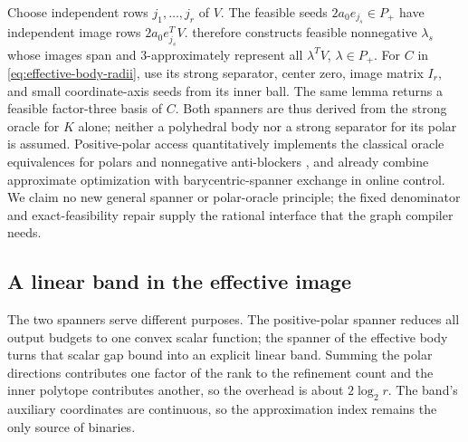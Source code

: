 Choose independent rows $j_1,\ldots,j_r$ of $V$.
The feasible seeds $2a_0e_{j_s}\in P_+$ have independent image rows
$2a_0e_{j_s}^TV$.  therefore constructs
feasible nonnegative $\lambda_s$ whose images span and
$3$-approximately represent all $\lambda^TV$, $\lambda\in P_+$.
For $C$ in \eqref{eq:effective-body-radii}, use its strong separator,
center zero, image matrix $I_r$, and small coordinate-axis seeds from
its inner ball. The same lemma returns a feasible factor-three basis
of $C$. Both spanners are thus derived from the strong oracle for $K$
alone; neither a polyhedral body nor a strong separator for its polar is
assumed. Positive-polar access quantitatively implements the classical
oracle equivalences for polars and nonnegative anti-blockers
\citep[Corollaries (3.4)--(3.5)]{gls1981}, and
\citet[Section 3.3]{plevrakis2020} already combine approximate
optimization with barycentric-spanner exchange in online control.
We claim no new general spanner or polar-oracle principle; the fixed
denominator and exact-feasibility repair supply the rational interface
that the graph compiler needs.

\subsection{A linear band in the effective image}

The two spanners serve different purposes. The positive-polar spanner
reduces all output budgets to one convex scalar function; the spanner of
the effective body turns that scalar gap bound into an explicit linear
band. Summing the polar directions contributes one factor of the rank to
the refinement count and the inner polytope contributes another, so the
overhead is about $2\log_2r$. The band's auxiliary coordinates are
continuous, so the approximation index remains the only source of binaries.

